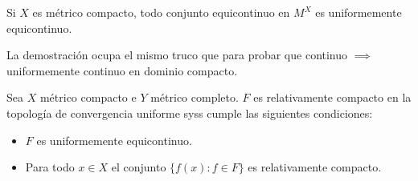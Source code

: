 \documentclass[topologia-analisis.tex]{subfiles}
\begin{document}
\begin{prop}
	Si $X$ es métrico compacto, todo conjunto equicontinuo en $M^X$ es uniformemente equicontinuo.
\end{prop}
\begin{hint}
	La demostración ocupa el mismo truco que para probar que continuo $\implies$ uniformemente continuo en dominio compacto.
\end{hint}

\begin{thmi}
	Sea $X$ métrico compacto e $Y$ métrico completo.
	$F$ es relativamente compacto en la topología de convergencia uniforme syss cumple las siguientes condiciones:
	\begin{itemize}
		\item $F$ es uniformemente equicontinuo.
		\item Para todo $x\in X$ el conjunto $\{f(x): f\in F\}$ es relativamente compacto.
	\end{itemize}
\end{thmi}
\end{document}
